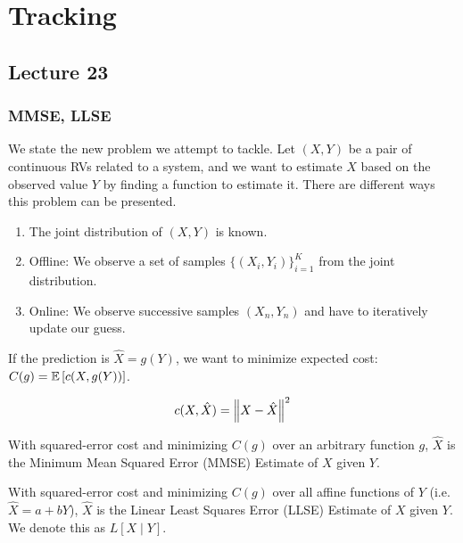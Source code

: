 \section{Tracking}
\subsection{Lecture 23}
\subsubsection{MMSE, LLSE}

We state the new problem we attempt to tackle. Let $(X, Y)$ be a pair of continuous RVs related to a system, and
we want to estimate $X$ based on the observed value $Y$ by finding a function to estimate it. There are different ways this problem can be presented.
\begin{enumerate}
    \item The joint distribution of $(X, Y)$ is known.
    \item Offline: We observe a set of samples $\{(X_i, Y_i)\}_{i = 1}^K$ from the joint distribution.
    \item Online: We observe successive samples $(X_n, Y_n)$ and have to iteratively update our guess.
\end{enumerate}

If the prediction is $\hat{X} = g(Y)$, we want to minimize expected cost: $C(g) = \mathbb{E}\left[ c(X, g(Y)) \right]$.

\begin{definition}
    \[ c(X, \hat{X}) = \norm{X - \hat{X}}^2 \]
\end{definition}

\begin{definition}[MMSE]
    With squared-error cost and minimizing $C(g)$ over an arbitrary function $g$, $\hat{X}$ is the Minimum Mean Squared Error (MMSE) Estimate of $X$ given $Y$.
\end{definition}

\begin{definition}[LLSE]
    With squared-error cost and minimizing $C(g)$ over all affine functions of $Y$ (i.e. $\hat{X} = a + bY$), $\hat{X}$ is the Linear Least Squares Error (LLSE) Estimate of $X$ given $Y$.
    We denote this as $L[X \mid Y]$.
\end{definition}

